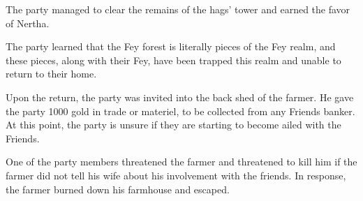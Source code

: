 The party managed to clear the remains of the hags' tower and earned the favor of Nertha.

The party learned that the Fey forest is literally pieces of the Fey realm, and these pieces, along with their Fey, have been trapped this realm and unable to return to their home.

Upon the return, the party was invited into the back shed of the farmer.
He gave the party 1000 gold in trade or materiel, to be collected from any Friends banker.
At this point, the party is unsure if they are starting to become ailed with the Friends.

One of the party members threatened the farmer and threatened to kill him if the farmer did not tell his wife about his involvement with the friends.
In response, the farmer burned down his farmhouse and escaped.
